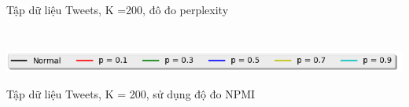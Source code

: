 \documentclass[pdf]{beamer}
\begin{document}
\begin{frame}{Tập dữ liệu Tweets, K =200, đô đo perplexity}
\begin{columns}[T]
\begin{column}{.50\textwidth}
\begin{figure}
\end{figure}				
\end{column} %
\end{columns}
\begin{center}
\includegraphics[width=1\textwidth]{menu.png}	
\end{center}
\end{frame}

\begin{frame}{Tập dữ liệu Tweets, K = 200, sử dụng độ đo NPMI }
\begin{columns}[T] %
\begin{column}{.50\textwidth}
\begin{figure}
\end{figure}
\end{column} %
\hfill%
\begin{column}{.50\textwidth}
\begin{figure}

\end{figure}
\end{column}
\end{columns}
\end{frame}
\end{document}
